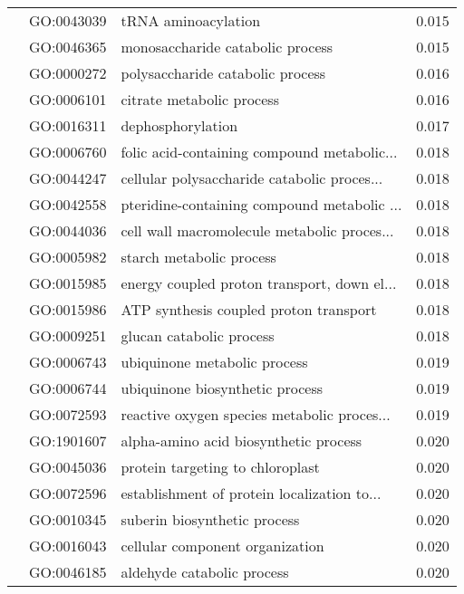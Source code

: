 \begin{longtable}{lllr}
   & GO:0043039 &                          tRNA aminoacylation &         0.015 \\
   & GO:0046365 &             monosaccharide catabolic process &         0.015 \\
   & GO:0000272 &             polysaccharide catabolic process &         0.016 \\
   & GO:0006101 &                    citrate metabolic process &         0.016 \\
   & GO:0016311 &                            dephosphorylation &         0.017 \\
   & GO:0006760 &  folic acid-containing compound metabolic... &         0.018 \\
   & GO:0044247 &  cellular polysaccharide catabolic proces... &         0.018 \\
   & GO:0042558 &  pteridine-containing compound metabolic ... &         0.018 \\
   & GO:0044036 &  cell wall macromolecule metabolic proces... &         0.018 \\
   & GO:0005982 &                     starch metabolic process &         0.018 \\
   & GO:0015985 &  energy coupled proton transport, down el... &         0.018 \\
   & GO:0015986 &       ATP synthesis coupled proton transport &         0.018 \\
   & GO:0009251 &                     glucan catabolic process &         0.018 \\
   & GO:0006743 &                 ubiquinone metabolic process &         0.019 \\
   & GO:0006744 &              ubiquinone biosynthetic process &         0.019 \\
   & GO:0072593 &  reactive oxygen species metabolic proces... &         0.019 \\
   & GO:1901607 &        alpha-amino acid biosynthetic process &         0.020 \\
   & GO:0045036 &             protein targeting to chloroplast &         0.020 \\
   & GO:0072596 &  establishment of protein localization to... &         0.020 \\
   & GO:0010345 &                 suberin biosynthetic process &         0.020 \\
   & GO:0016043 &              cellular component organization &         0.020 \\
   & GO:0046185 &                   aldehyde catabolic process &         0.020 \\

\end{longtable}
